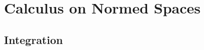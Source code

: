 \documentclass[crop=false,class=article,oneside]{standalone}
\begin{document}
    \ifx\ifsub\undefined
        \section*{Calculus on Normed Spaces}
        \setcounter{section}{1}
    \fi
    \subsection{Integration}
\end{document}
